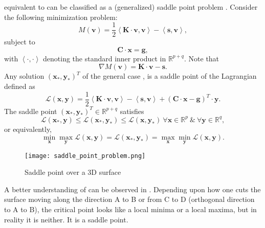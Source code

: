 equivalent to  can be classified as a (generalized) saddle point problem \cite{Benzi2005}. Consider the following minimization problem:
\begin{equation}
M(\mathbf{v}) = \dfrac{1}{2} \left\langle \mathbf{K} \cdot \mathbf{v}, \mathbf{v} \right\rangle - \left\langle \mathbf{s}, \mathbf{v} \right\rangle,
\label{eq:3.12}
\end{equation}
subject to 
\begin{equation}
\mathbf{C} \cdot \mathbf{x} = \mathbf{g},
\label{eq:3.13}
\end{equation}
with $\left\langle \cdot, \cdot \right\rangle$ denoting the standard inner product in $\mathbb{R}^{p+q}$.
Note that
\begin{equation}
\nabla M(\mathbf{v}) = \mathbf{K} \cdot \mathbf{v} - \mathbf{s}.
\end{equation}
Any solution $(\mathbf{x}_{\ast}, \mathbf{y}_{\ast})^T$ of the general case , is a saddle point of the Lagrangian defined as
\begin{equation}
\mathcal{L}(\mathbf{x}, \mathbf{y}) = \dfrac{1}{2} \left\langle \mathbf{K} \cdot \mathbf{v}, \mathbf{v} \right\rangle - \left\langle \mathbf{s}, \mathbf{v} \right\rangle + (\mathbf{C} \cdot \mathbf{x} - \mathbf{g})^T \cdot \mathbf{y}.
\label{eq:3.14}
\end{equation}
The saddle point $(\mathbf{x}_{\ast}, \mathbf{y}_{\ast})^T \in \mathbb{R}^{p+q}$ satisfies
\begin{equation}
\mathcal{L}(\mathbf{x}_{\ast}, \mathbf{y}) \leq \mathcal{L}(\mathbf{x}_{\ast}, \mathbf{y}_{\ast}) \leq \mathcal{L}(\mathbf{x}, \mathbf{y}_{\ast}) \ \forall \mathbf{x} \in \mathbb{R}^p \ \& \ \forall \mathbf{y} \in \mathbb{R}^q, 
\label{eq:3.15.1}
\end{equation}
or equivalently, 
\begin{equation}
\min_{\mathbf{x}} \max_{\mathbf{y}} \mathcal{L}(\mathbf{x}, \mathbf{y}) = \mathcal{L}(\mathbf{x}_{\ast}, \mathbf{y}_{\ast}) = \max_{\mathbf{x}} \min_{\mathbf{y}} \mathcal{L}(\mathbf{x}, \mathbf{y}).
\label{eq:3.15.2}
\end{equation}

\begin{figure}[h]
\centering
\texttt{[image: saddle\_point\_problem.png]}
\caption{Saddle point over a 3D surface \cite{Buduma_book}}
\label{fig:3.1}
\end{figure}

A better understanding of  can be observed in . Depending upon how one cuts the surface moving along the direction A to B or from C to D (orthogonal direction to A to B), the critical point looks like a local minima or a local maxima, but in reality it is neither. It is a saddle point. \par 

